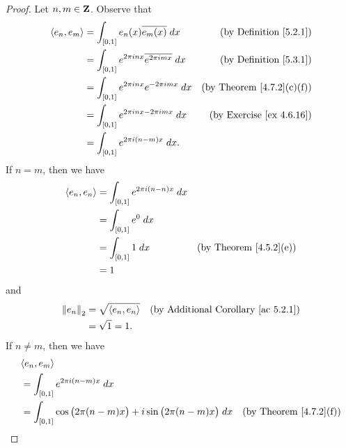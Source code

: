 \begin{proof}
    Let \(n, m \in \Z\).
    Observe that
    \begin{align*}
        \inner*{e_n, e_m} & = \int_{[0, 1]} e_n(x) \overline{e_m(x)} \; dx                   & \text{(by Definition \ref{5.2.1})}    \\
                          & = \int_{[0, 1]} e^{2 \pi i n x} \overline{e^{2 \pi i m x}} \; dx & \text{(by Definition \ref{5.3.1})}    \\
                          & = \int_{[0, 1]} e^{2 \pi i n x} e^{- 2 \pi i m x} \; dx          & \text{(by Theorem \ref{4.7.2}(c)(f))} \\
                          & = \int_{[0, 1]} e^{2 \pi i n x - 2 \pi i m x} \; dx              & \text{(by Exercise \ref{ex 4.6.16})}  \\
                          & = \int_{[0, 1]} e^{2 \pi i (n - m) x} \; dx.
    \end{align*}
    If \(n = m\), then we have
    \begin{align*}
        \inner*{e_n, e_n} & = \int_{[0, 1]} e^{2 \pi i (n - n) x} \; dx                                      \\
                          & = \int_{[0, 1]} e^0 \; dx                                                        \\
                          & = \int_{[0, 1]} 1 \; dx                     & \text{(by Theorem \ref{4.5.2}(e))} \\
                          & = 1
    \end{align*}
    and
    \begin{align*}
        \norm*{e_n}_2 & = \sqrt{\inner*{e_n, e_n}} & \text{(by Additional Corollary \ref{ac 5.2.1})} \\
                      & = \sqrt{1} = 1.
    \end{align*}
    If \(n \neq m\), then we have
    \begin{align*}
         & \inner*{e_n, e_m}                                                                                                                                \\
         & = \int_{[0, 1]} e^{2 \pi i (n - m) x} \; dx                                                                                                      \\
         & = \int_{[0, 1]} \cos\big(2 \pi (n - m) x\big) + i \sin\big(2 \pi (n - m) x\big) \; dx       & \text{(by Theorem \ref{4.7.2}(f))}                 \\

\end{align*}
\end{proof}
